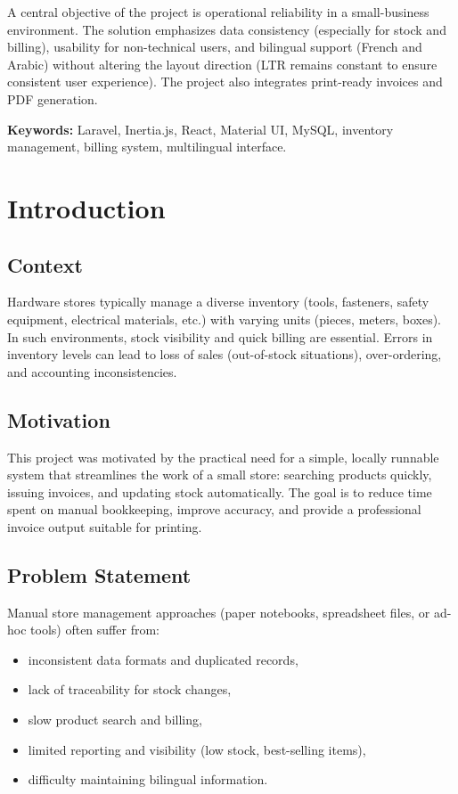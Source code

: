 \documentclass[12pt,a4paper]{report}
\begin{document}
A central objective of the project is operational reliability in a small-business environment. The solution emphasizes data consistency (especially for stock and billing), usability for non-technical users, and bilingual support (French and Arabic) without altering the layout direction (LTR remains constant to ensure consistent user experience). The project also integrates print-ready invoices and PDF generation.

\textbf{Keywords:} Laravel, Inertia.js, React, Material UI, MySQL, inventory management, billing system, multilingual interface.

\chapter{Introduction}

\section{Context}
Hardware stores typically manage a diverse inventory (tools, fasteners, safety equipment, electrical materials, etc.) with varying units (pieces, meters, boxes). In such environments, stock visibility and quick billing are essential. Errors in inventory levels can lead to loss of sales (out-of-stock situations), over-ordering, and accounting inconsistencies.

\section{Motivation}
This project was motivated by the practical need for a simple, locally runnable system that streamlines the work of a small store: searching products quickly, issuing invoices, and updating stock automatically. The goal is to reduce time spent on manual bookkeeping, improve accuracy, and provide a professional invoice output suitable for printing.

\section{Problem Statement}
Manual store management approaches (paper notebooks, spreadsheet files, or ad-hoc tools) often suffer from:
\begin{itemize}
  \item inconsistent data formats and duplicated records,
  \item lack of traceability for stock changes,
  \item slow product search and billing,
  \item limited reporting and visibility (low stock, best-selling items),
  \item difficulty maintaining bilingual information.
\end{itemize}
\end{document}
